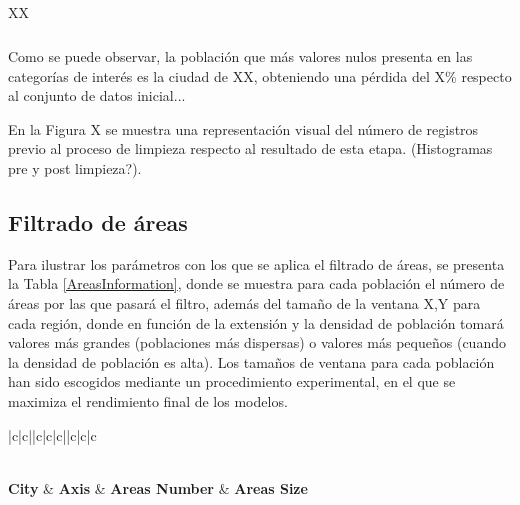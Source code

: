 \documentclass{uathesis-es}
\begin{document}
{\begin{table}[H]
\begin{center}
\begin{tabular}{|c|c||c|c|}
			\end{tabular}
			\caption{XX}
			\label{DataDistribution}
		\end{center}
	\end{table}
	
	Como se puede observar, la población que más valores nulos presenta en las categorías de interés es la ciudad de XX, obteniendo una pérdida del X\% respecto al conjunto de datos inicial...
	
	En la Figura X se muestra una representación visual del número de registros previo al proceso de limpieza respecto al resultado de esta etapa.
	(Histogramas pre y post limpieza?).
	
	
	
	
	\subsection{Filtrado de áreas}
	
	
	Para ilustrar los parámetros con los que se aplica el filtrado de áreas, se presenta la Tabla \ref{AreasInformation}, donde se muestra para cada población el número de áreas por las que pasará el filtro, además del tamaño de la ventana X,Y para cada región, donde en función de la extensión y la densidad de población tomará valores más grandes (poblaciones más dispersas) o valores más pequeños (cuando la densidad de población es alta). Los tamaños de ventana para cada población han sido escogidos mediante un procedimiento experimental, en el que se maximiza el rendimiento final de los modelos.
	
	\begin{table}[H]
		\begin{center}
			\begin{tabular}{|c|c||c|c|c||c|c|c}
				\hline
				 \\ \hline
				
				 \\ \hline
				\textbf{City} & \textbf{Axis} & \textbf{Areas Number} & \textbf{Areas Size}
				\\ \hline  \hline 
				

\end{tabular}
\end{center}
\end{table}}
\end{document}
